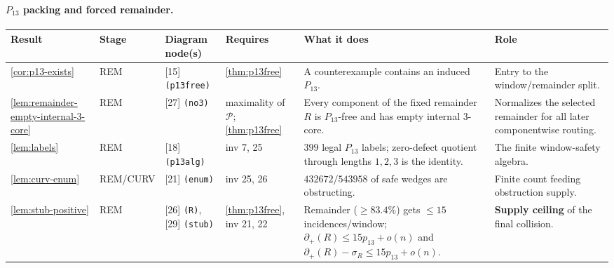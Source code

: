 \documentclass[11pt]{article}
\newcommand{\defp}{\partial_+}
\begin{document}
\paragraph{$P_{13}$ packing and forced remainder.}
{\scriptsize\setlength{\tabcolsep}{3pt}
\begin{longtable}{L{0.10\textwidth} C{0.045\textwidth} L{0.13\textwidth} L{0.135\textwidth} L{0.28\textwidth} L{0.20\textwidth}}
\toprule
\textbf{Result} & \textbf{Stage} & \textbf{Diagram node(s)} & \textbf{Requires} & \textbf{What it does} & \textbf{Role} \\
\midrule
\endhead
\cref{cor:p13-exists} & REM & [15] \texttt{(p13free)} & \cref{thm:p13free} & A counterexample contains an induced $P_{13}$. & Entry to the window/remainder split. \\
\cref{lem:remainder-empty-internal-3-core} & REM & [27] \texttt{(no3)} & maximality of $\mathcal P$; \cref{thm:p13free} & Every component of the fixed remainder $R$ is $P_{13}$-free and has empty internal $3$-core. & Normalizes the selected remainder for all later componentwise routing. \\
\cref{lem:labels} & REM & [18] \texttt{(p13alg)} & inv 7, 25 & $399$ legal $P_{13}$ labels; zero-defect quotient through lengths $1,2,3$ is the identity. & The finite window-safety algebra. \\
\cref{lem:curv-enum} & REM\slash CURV & [21] \texttt{(enum)} & inv 25, 26 & $432672/543958$ of safe wedges are obstructing. & Finite count feeding obstruction supply. \\
\cref{lem:stub-positive} & REM & [26] \texttt{(R)}, [29] \texttt{(stub)} & \cref{thm:p13free}, inv 21, 22 & Remainder ($\ge83.4\%$) gets $\le15$ incidences/window; \(\defp(R)\le15p_{13}+o(n)\) and \(\defp(R)-\sigma_R\le15p_{13}+o(n)\). & \textbf{Supply ceiling} of the final collision. \\
\bottomrule
\end{longtable}
}
\end{document}
